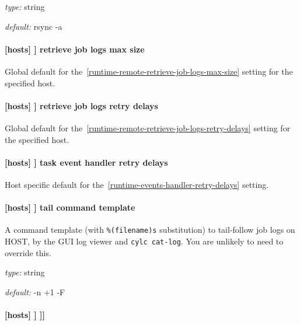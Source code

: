\begin{myitemize}
\item {\em type:} string
\item {\em default:} rsync -a
\end{myitemize}

\paragraph[retrieve job logs max size]{[hosts] \textrightarrow [[HOST]] \textrightarrow retrieve job logs max size}

Global default for the~\ref{runtime-remote-retrieve-job-logs-max-size} setting for the
specified host.

\paragraph[retrieve job logs retry delays]{[hosts] \textrightarrow [[HOST]] \textrightarrow retrieve job logs retry delays}

Global default for the~\ref{runtime-remote-retrieve-job-logs-retry-delays}
setting for the specified host.

\paragraph[task event handler retry delays]{[hosts] \textrightarrow [[HOST]] \textrightarrow task event handler retry delays}

Host specific default for the~\ref{runtime-events-handler-retry-delays}
setting.

\paragraph[tail command template]{[hosts] \textrightarrow [[HOST]] \textrightarrow tail command template}
\label{tail-command-template}

A command template (with \lstinline=%(filename)s= substitution) to tail-follow
job logs on HOST, by the GUI log viewer and \lstinline=cylc cat-log=. You are
unlikely to need to override this.

\begin{myitemize}
\item {\em type:} string
\item {\em default:} \lstinline@tail -n +1 -F %(filename)s@
\end{myitemize}

\paragraph[{[[[}batch systems{]]]}]{[hosts] \textrightarrow [[HOST]] \textrightarrow [[[batch systems]]]}

